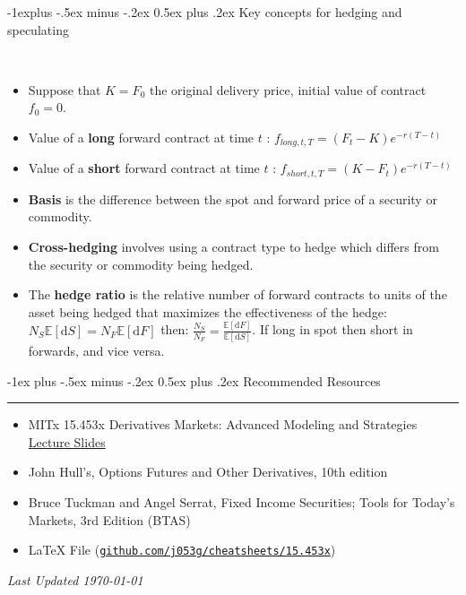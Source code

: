 \documentclass[10pt,landscape,a4paper]{article}
\makeatletter
\renewcommand{\section}{\@startsection{section}{1}{0mm}%
                                {-1ex plus -.5ex minus -.2ex}%
                                {0.5ex plus .2ex}%
                                {\normalfont\large\bfseries}}
\renewcommand{\subsection}{\@startsection{subsection}{2}{0mm}%
                                {-1explus -.5ex minus -.2ex}%
                                {0.5ex plus .2ex}%
                                {\normalfont\normalsize\bfseries}}
\makeatother
\begin{document}
\begin{multicols*}{3}
\subsection{Key concepts for hedging and speculating}
  \begin{description}[topsep=0pt]
	\item[Valuing a forward contract over time] ~
	\begin{itemize}[topsep=0pt]
		\item Suppose that $K=F_0$ the original delivery price, initial value of contract $f_0=0$.
		\item Value of a \textbf{long} forward contract at time $t$ :  $f_{long,t,T} = (F_t-K) e ^{-r(T-t)}$ 
		\item Value of a \textbf{short} forward contract at time $t$ :  $f_{short,t,T} = (K-F_t) e ^{-r(T-t)}$ 
		\item \textbf{Basis} is the difference between the spot and forward price
		of a security or commodity.
		\item \textbf{Cross-hedging} involves using a contract type to hedge
		which differs from the security or commodity being hedged.
		\item The \textbf{hedge ratio} is the relative number of forward contracts to units
		of the asset being hedged that maximizes the effectiveness of the hedge:  $N_S \mathbb{E}[\text{d}S] = N_F \mathbb{E}[\text{d}F] $ then: $\frac{N_S}{N_F} = \frac{\mathbb{E}[\text{d}F]}{\mathbb{E}[\text{d}S]}$. If long in spot then short in forwards, and vice versa.
	\end{itemize}
\end{description}
 
\newpage

\section{Recommended Resources} \smallskip \hrule height 1pt \smallskip

\bigskip

\begin{itemize}
\item MITx 15.453x 
Derivatives Markets: Advanced Modeling and Strategies \href{https://learning.edx.org/course/course-v1:MITx+15.435x+1T2021/home}{Lecture Slides}

\item John Hull’s, Options Futures and Other Derivatives, 10th edition
\item Bruce Tuckman and Angel Serrat, Fixed Income Securities; Tools for Today’s Markets, 3rd Edition (BTAS) 
\item LaTeX File (\texttt{\href{https://github.com/j053g/cheatsheets/blob/main/15.453x/15.453x_derivatives_markets.tex}{github.com/j053g/cheatsheets/15.453x}})
\end{itemize}

\begin{center}
	\emph{Last Updated \today}
\end{center}

\end{multicols*}
\end{document}
